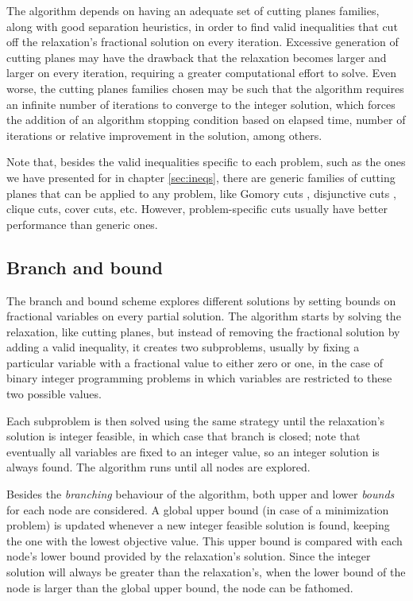 The algorithm depends on having an adequate set of cutting planes families, along with good separation heuristics, in order to find valid inequalities that cut off the relaxation's fractional solution on every iteration. Excessive generation of cutting planes may have the drawback that the relaxation becomes larger and larger on every iteration, requiring a greater computational effort to solve. Even worse, the cutting planes families chosen may be such that the algorithm requires an infinite number of iterations to converge to the integer solution, which forces the addition of an algorithm stopping condition based on elapsed time, number of iterations or relative improvement in the solution, among others.

Note that, besides the valid inequalities specific to each problem, such as the ones we have presented for \PCP{} in chapter \ref{sec:ineqs}, there are generic families of cutting planes that can be applied to any problem, like Gomory cuts \cite{gomory1958outline}, disjunctive cuts \cite{balas1993lift}, clique cuts, cover cuts, etc. However, problem-specific cuts usually have better performance than generic ones.

\subsection{Branch and bound}

The branch and bound scheme explores different solutions by setting bounds on fractional variables on every partial solution. The algorithm starts by solving the relaxation, like cutting planes, but instead of removing the fractional solution by adding a valid inequality, it creates two subproblems, usually by fixing a particular variable with a fractional value to either zero or one, in the case of binary integer programming problems in which variables are restricted to these two possible values. 

Each subproblem is then solved using the same strategy until the relaxation's solution is integer feasible, in which case that branch is closed; note that eventually all variables are fixed to an integer value, so an integer solution is always found. The algorithm runs until all nodes are explored.

Besides the \textit{branching} behaviour of the algorithm, both upper and lower \textit{bounds} for each node are considered. A global upper bound (in case of a minimization problem) is updated whenever a new integer feasible solution is found, keeping the one with the lowest objective value. This upper bound is compared with each node's lower bound provided by the relaxation's solution. Since the integer solution will always be greater than the relaxation's, when the lower bound of the node is larger than the global upper bound, the node can be fathomed.

